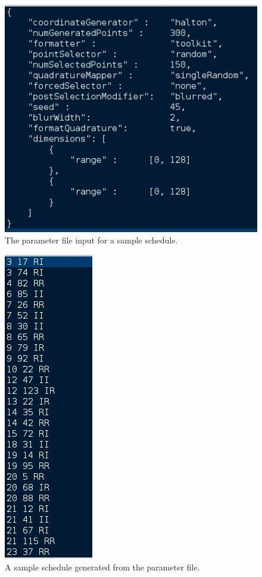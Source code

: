 \begin{figure}
  \includegraphics[scale=0.75]{figures/schedule_parameters}
  \caption{The parameter file input for a sample schedule.}
  \label{schedule_parameters}
\end{figure}

\begin{figure}
  \includegraphics[scale=0.75]{figures/schedule_data}
  \caption{A sample schedule generated from the parameter file.}
  \label{schedule_data}
\end{figure}

